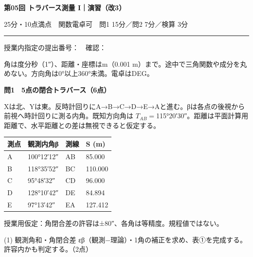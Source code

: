 \documentclass[a4paper,10pt]{article}
\newcommand{\ttl}[2]{{\color{navy}\Large\bfseries #1}\par{\small #2}\par\vspace{2pt}\hrule\vspace{7pt}}
\newcommand{\sub}[1]{\par{\color{navy}\large\bfseries #1}\par}
\newcommand{\note}[1]{{\small\color{blue}#1}\par}
\begin{document}
\ttl{第05回 トラバース測量 I｜演習（改3）}{25分・10点満点　関数電卓可　問1 15分／問2 7分／検算 3分}
授業内指定の提出番号：\underline{\hspace{38mm}}　確認：\underline{\hspace{30mm}}

{\small 角は度分秒（1″）、距離・座標はm（0.001 m）まで。途中で三角関数や成分を丸めない。方向角は0°以上360°未満。電卓はDEG。}
\sub{問1　5点の閉合トラバース（6点）}
{\small Xは北、Yは東。反時計回りにA→B→C→D→E→Aと進む。βは各点の後視から前視へ時計回りに測る内角。既知方向角は $T_{AB}=$115°20′30″。距離は平面計算用距離で、水平距離との差は無視できると仮定する。}
\begin{center}\small\begin{tabular}{|l|l|l|l|}
\hline
\textbf{測点} & \textbf{観測内角β} & \textbf{測線} & \textbf{S (m)} \\ \hline
A & 100°12′12″ & AB & 85.000 \\ \hline
B & 118°35′52″ & BC & 110.000 \\ \hline
C & 95°48′32″ & CD & 96.000 \\ \hline
D & 128°10′42″ & DE & 84.894 \\ \hline
E & 97°13′42″ & EA & 127.412 \\ \hline
\end{tabular}\end{center}
\note{授業用仮定：角閉合差の許容は±80″、各角は等精度。規程値ではない。}
{\small (1) 観測角和・角閉合差 εβ（観測−理論）・1角の補正を求め、表①を完成する。許容内かも判定する。（2点）}
\end{document}
